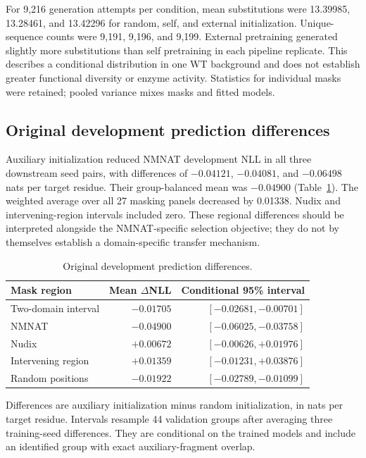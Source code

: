 \documentclass[referee,pdflatex,sn-vancouver-num]{sn-jnl}
\begin{document}
For 9,216 generation attempts per condition, mean substitutions were 13.39985, 13.28461, and 13.42296 for random, self, and external initialization. Unique-sequence counts were 9,191, 9,196, and 9,199. External pretraining generated slightly more substitutions than self pretraining in each pipeline replicate. This describes a conditional distribution in one WT background and does not establish greater functional diversity or enzyme activity. Statistics for individual masks were retained; pooled variance mixes masks and fitted models.

\subsection{Original development prediction differences}
Auxiliary initialization reduced NMNAT development NLL in all three downstream seed pairs, with differences of $-0.04121$, $-0.04081$, and $-0.06498$ nats per target residue. Their group-balanced mean was $-0.04900$ (Table~\ref{tab:prediction}). The weighted average over all 27 masking panels decreased by 0.01338. Nudix and intervening-region intervals included zero. These regional differences should be interpreted alongside the NMNAT-specific selection objective; they do not by themselves establish a domain-specific transfer mechanism.

\begin{table}[htbp]
\caption{Original development prediction differences.}\label{tab:prediction}
\centering
\begin{tabular}{lrr}
\toprule
Mask region & Mean $\Delta$NLL & Conditional 95\% interval \\
\midrule
Two-domain interval & $-0.01705$ & $[-0.02681,-0.00701]$ \\
NMNAT & $-0.04900$ & $[-0.06025,-0.03758]$ \\
Nudix & $+0.00672$ & $[-0.00626,+0.01976]$ \\
Intervening region & $+0.01359$ & $[-0.01231,+0.03876]$ \\
Random positions & $-0.01922$ & $[-0.02789,-0.01099]$ \\
\bottomrule
\end{tabular}
\par\smallskip\small Differences are auxiliary initialization minus random initialization, in nats per target residue. Intervals resample 44 validation groups after averaging three training-seed differences. They are conditional on the trained models and include an identified group with exact auxiliary-fragment overlap.
\end{table}
\end{document}
